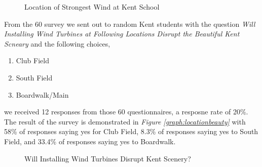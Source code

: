 \documentclass[review]{elsarticle}
\begin{document}
\clearpage

\begin{figure}
    \caption{Location of Strongest Wind at Kent School}
    \label{fig:locationpick}
\end{figure}

From the 60 survey we sent out to random Kent students with the question \textit{Will Installing Wind Turbines at Following Locations Disrupt the Beautiful Kent Scneary} 
and the following choices,
\begin{enumerate}
    \item Club Field
    \item South Field
    \item Boardwalk/Main
\end{enumerate}

we received 12 responses from those 60 questionnaires, a resposne rate of 20\%. The result of the survey is demonstrated in \textit{Figure \ref{graph:locationbeauty}} with 58\% of responses saying yes 
for Club Field, 8.3\% of responses saying yes to South Field, and 33.4\% of responses saying yes to Boardwalk.\\

\begin{figure}[!h]
    \caption{Will Installing Wind Turbines Disrupt Kent Scenery?}
\end{figure}
\end{document}
